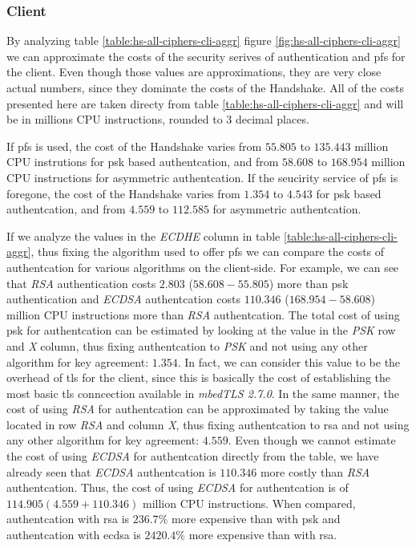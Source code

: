 \documentclass{llncs}
\begin{document}
\subsubsection{Client}

By analyzing table \ref{table:hs-all-ciphers-cli-aggr} figure \ref{fig:hs-all-ciphers-cli-aggr} we can approximate
the costs of the security serives of authentication and \gls{pfs} for the client. Even though those values are approximations, 
they are very close actual numbers, since they dominate the costs of the Handshake. All of the costs presented here
are taken directy from table \ref{table:hs-all-ciphers-cli-aggr} and will be in millions CPU instructions, 
rounded to $3$ decimal places.

If \gls{pfs} is used, the cost of the Handshake varies from $55.805$ to $135.443$ 
million CPU instrutions for \gls{psk} based authentcation, and from $58.608$ to $168.954$ million CPU instructions for 
asymmetric authentcation. If the seucirity service of \gls{pfs} is foregone, the cost
of the Handshake varies from $1.354$ to $4.543$ for \gls{psk} based authentcation,
and from $4.559$ to $112.585$ for asymmetric authentcation.

If we analyze the values in the \textit{ECDHE} column in table \ref{table:hs-all-ciphers-cli-aggr}, thus fixing the
algorithm used to offer \gls{pfs} we can compare the costs of authentcation for various algorithms on the client-side.
For example, we can see that \textit{RSA} authentication costs $2.803$  ($58.608 - 55.805$) 
more than \gls{psk} authentication and \textit{ECDSA} authentcation costs $110.346$ ($168.954 - 58.608$) 
million CPU instructions more than
\textit{RSA} authentcation. The total cost of using \gls{psk} for authentcation can be estimated by looking at the
value in the \textit{PSK} row and \textit{X} column, thus fixing authentcation to \textit{PSK} and not using any other
algorithm for key agreement: $1.354$. In fact, we can consider this value to be the overhead of \gls{tls} for the client,
since this is basically the cost of establishing the most basic \gls{tls} conncection available in \textit{mbedTLS 2.7.0}.
In the same manner, the cost of using \textit{RSA} for authentcation can
be approximated by taking the value located in row \textit{RSA} and column \textit{X}, thus fixing authentcation
to \gls{rsa} and not using any other algorithm for key agreement: $4.559$. Even though we cannot estimate the cost
of using \textit{ECDSA} for authentcation directly from the table, we have already seen that \textit{ECDSA} authentcation
is $110.346$ more costly than \textit{RSA} authentcation. Thus, the cost of using \textit{ECDSA} for authentcation
is of $114.905 (4.559+110.346)$ million CPU instructions. When compared, authentcation with \gls{rsa} is
$236.7\%$ more expensive than with \gls{psk} and authentcation with \gls{ecdsa} is $2420.4\%$ more 
expensive than with \gls{rsa}.
\end{document}

